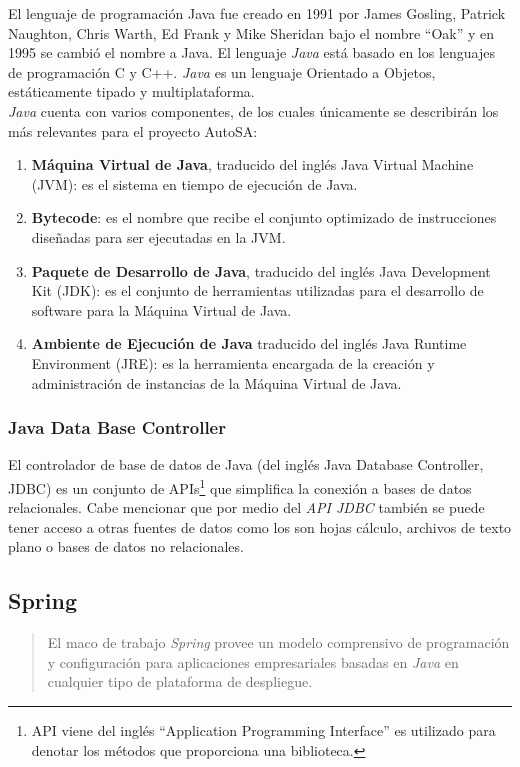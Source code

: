 El lenguaje de programación Java fue creado en 1991 por James Gosling, Patrick Naughton, Chris Warth, Ed Frank y Mike Sheridan bajo el nombre ``Oak'' y en 1995 se cambió el nombre a Java. El lenguaje \textit{Java} está basado en los lenguajes de programación C y C++. \textit{Java} es un lenguaje Orientado a Objetos, estáticamente tipado y multiplataforma\cite{JavaCompleteReference, WellGroundedJavaDeveloper}.\\
\textit{Java} cuenta con varios componentes, de los cuales únicamente se describirán los más relevantes para el proyecto AutoSA\cite{JavaCompleteReference, WellGroundedJavaDeveloper}:
\begin{enumerate}
	\item \textbf{Máquina Virtual de Java}, traducido del inglés Java Virtual Machine (JVM): es el sistema en tiempo de ejecución de Java.
	\item \textbf{Bytecode}: es el nombre que recibe el conjunto optimizado de instrucciones diseñadas para ser ejecutadas en la JVM.
	\item \textbf{Paquete de Desarrollo de Java}, traducido del inglés Java Development Kit (JDK): es el conjunto de herramientas utilizadas para el desarrollo de software para la Máquina Virtual de Java.
	\item \textbf{Ambiente de Ejecución de Java} traducido del inglés Java Runtime Environment (JRE): es la herramienta encargada de la creación y administración de instancias de la Máquina Virtual de Java.
\end{enumerate}

\subsubsection{Java Data Base Controller}\label{sec:jdbc}
El controlador de base de datos de Java (del inglés Java Database Controller, JDBC) es un conjunto de APIs\footnote{API viene del inglés ``Application Programming Interface'' es utilizado para denotar los métodos que proporciona una biblioteca.} que simplifica la conexión a bases de datos relacionales. Cabe mencionar que por medio del \textit{API JDBC} también se puede tener acceso a otras fuentes de datos como los son hojas cálculo, archivos de texto plano o bases de datos no relacionales\cite{JDBCRecipes, BeginingJava8APIs}.

\subsection{Spring}\label{sec:spring}
\begin{quote}
	El maco de trabajo \textit{Spring} provee un modelo comprensivo de programación y configuración para aplicaciones empresariales basadas en \textit{Java} en cualquier tipo de plataforma de despliegue\cite{SpringFramework}.
\end{quote}

